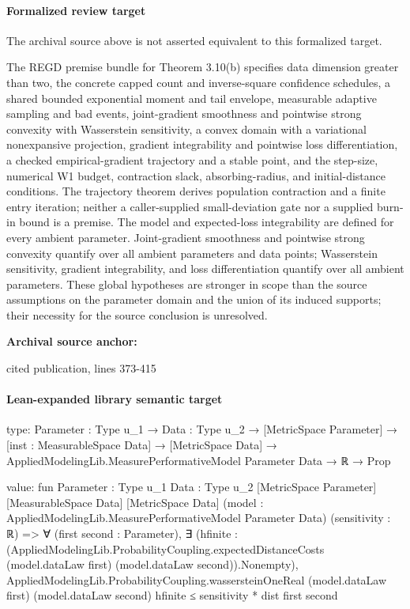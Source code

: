\documentclass[10pt]{article}
\begin{document}
\paragraph{Formalized review target}
The archival source above is not asserted equivalent to this formalized target.
\begin{ReviewVerbatim}
The REGD premise bundle for Theorem 3.10(b) specifies data dimension greater than two, the concrete capped count and inverse-square confidence schedules, a shared bounded exponential moment and tail envelope, measurable adaptive sampling and bad events, joint-gradient smoothness and pointwise strong convexity with Wasserstein sensitivity, a convex domain with a variational nonexpansive projection, gradient integrability and pointwise loss differentiation, a checked empirical-gradient trajectory and a stable point, and the step-size, numerical W1 budget, contraction slack, absorbing-radius, and initial-distance conditions. The trajectory theorem derives population contraction and a finite entry iteration; neither a caller-supplied small-deviation gate nor a supplied burn-in bound is a premise. The model and expected-loss integrability are defined for every ambient parameter. Joint-gradient smoothness and pointwise strong convexity quantify over all ambient parameters and data points; Wasserstein sensitivity, gradient integrability, and loss differentiation quantify over all ambient parameters. These global hypotheses are stronger in scope than the source assumptions on the parameter domain and the union of its induced supports; their necessity for the source conclusion is unresolved.
\end{ReviewVerbatim}

\textbf{Archival source anchor:} {\footnotesize\raggedright cited publication, lines 373-\allowbreak{}415\par}
\paragraph{Lean-expanded library semantic target}
\begin{ReviewVerbatim}
type:
{Parameter : Type u_1} →
  {Data : Type u_2} →
    [MetricSpace Parameter] →
      [inst : MeasurableSpace Data] →
        [MetricSpace Data] → AppliedModelingLib.MeasurePerformativeModel Parameter Data → ℝ → Prop

value:
fun {Parameter : Type u_1} {Data : Type u_2} [MetricSpace Parameter] [MeasurableSpace Data] [MetricSpace Data]
    (model : AppliedModelingLib.MeasurePerformativeModel Parameter Data) (sensitivity : ℝ) =>
  ∀ (first second : Parameter),
    ∃ (hfinite :
      (AppliedModelingLib.ProbabilityCoupling.expectedDistanceCosts (model.dataLaw first)
          (model.dataLaw second)).Nonempty),
      AppliedModelingLib.ProbabilityCoupling.wassersteinOneReal (model.dataLaw first) (model.dataLaw second) hfinite ≤
        sensitivity * dist first second
\end{ReviewVerbatim}
\end{document}
